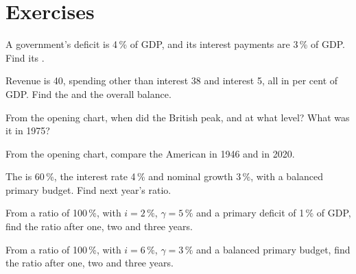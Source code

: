 \section{Exercises}

\begin{exercise}[$\star$]\label{exo:g12:fiscal-policy-and-debt:1}
A government's deficit is 4\,\% of GDP, and its interest payments are 3\,\% of GDP. Find its .
\end{exercise}

\begin{exercise}[$\star$]\label{exo:g12:fiscal-policy-and-debt:2}
Revenue is 40, spending other than interest 38 and interest 5, all in per cent of GDP. Find the  and the overall balance.
\end{exercise}

\begin{exercise}[$\star$]\label{exo:g12:fiscal-policy-and-debt:3}
From the opening chart, when did the British  peak, and at what level? What was it in 1975?
\end{exercise}

\begin{exercise}[$\star$]\label{exo:g12:fiscal-policy-and-debt:4}
From the opening chart, compare the American  in 1946 and in 2020.
\end{exercise}

\begin{exercise}[$\star$]\label{exo:g12:fiscal-policy-and-debt:5}
The  is 60\,\%, the interest rate 4\,\% and nominal growth 3\,\%, with a balanced primary budget. Find next year's ratio.
\end{exercise}

\begin{exercise}[$\star\star$]\label{exo:g12:fiscal-policy-and-debt:6}
From a ratio of 100\,\%, with $i = 2\,\%$, $\gamma = 5\,\%$ and a primary deficit of 1\,\% of GDP, find the ratio after one, two and three years.
\end{exercise}

\begin{exercise}[$\star\star$]\label{exo:g12:fiscal-policy-and-debt:7}
From a ratio of 100\,\%, with $i = 6\,\%$, $\gamma = 3\,\%$ and a balanced primary budget, find the ratio after one, two and three years.
\end{exercise}

